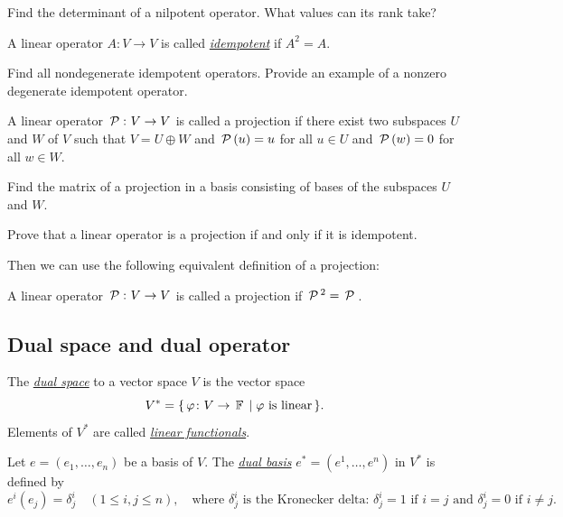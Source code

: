 \begin{exercise}
Find the determinant of a nilpotent operator. What values can its rank take?
\end{exercise}

\begin{definition}
A linear operator $A\colon V \to V$ is called \underline{\it idempotent} if $A^2 = A$.
\end{definition}

\begin{exercise}
Find all nondegenerate idempotent operators. Provide an example of a nonzero degenerate idempotent operator.
\end{exercise}

\begin{definition}
A linear operator $\P\colon V \to V$ is called a projection if there exist two subspaces $U$ and $W$ of $V$ such that $V = U \oplus W$ and $\P(u) = u$ for all $u \in U$ and $\P(w) = 0$ for all $w \in W$.
\end{definition}

\begin{exercise}
Find the matrix of a projection in a basis consisting of bases of the subspaces $U$ and $W$.
\end{exercise}

\begin{exercise}
Prove that a linear operator is a projection if and only if it is idempotent.
\end{exercise}

Then we can use the following equivalent definition of a projection:

\begin{definition}
A linear operator $\P\colon V \to V$ is called a projection if $\P^2 = \P$.
\end{definition}

\subsection{Dual space and dual operator}

\begin{definition}
The \underline{\it dual space} to a vector space $V$ is the vector space
$$
V^* = \{\, \varphi \colon V \to \F \mid \varphi \text{ is linear}\,\}.
$$
Elements of $V^*$ are called \underline{\it linear functionals}.
\end{definition}

\begin{definition}
Let $e=(e_1,\dots,e_n)$ be a basis of $V$. The \underline{\it dual basis} $e^*=(e^1,\dots,e^n)$ in $V^*$ is defined by
$$
e^i(e_j)=\delta^i_j \quad (1\le i,j\le n), \quad \text{where $\delta^i_j$ is the Kronecker delta: $\delta^i_j = 1$ if $i=j$ and $\delta^i_j = 0$ if $i\neq j$}.
$$
\end{definition}

